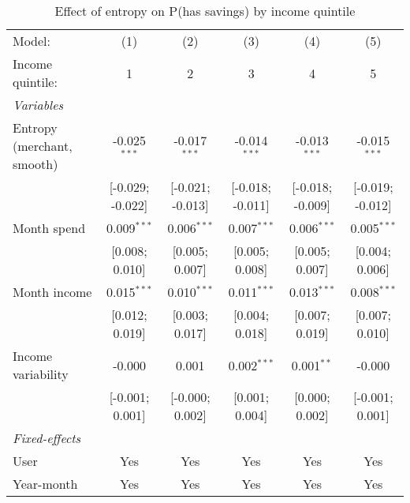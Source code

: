 
\begin{table}[htbp]
   \centering
   \tiny
   \begin{threeparttable}[b]
      \caption{\label{tab:reg_has_inflows_entropy_merchant_sz_inc_quint} Effect of entropy on P(has savings) by income quintile}
      \begin{tabular}{lccccc}
         \tabularnewline \midrule \midrule
         Model:                     & (1)              & (2)              & (3)              & (4)              & (5)\\  
         Income quintile:           & 1                & 2                & 3                & 4                & 5 \\   
         \midrule
         \emph{Variables}\\
         Entropy (merchant, smooth) & -0.025$^{***}$   & -0.017$^{***}$   & -0.014$^{***}$   & -0.013$^{***}$   & -0.015$^{***}$\\   
                                    & [-0.029; -0.022] & [-0.021; -0.013] & [-0.018; -0.011] & [-0.018; -0.009] & [-0.019; -0.012]\\   
         Month spend                & 0.009$^{***}$    & 0.006$^{***}$    & 0.007$^{***}$    & 0.006$^{***}$    & 0.005$^{***}$\\   
                                    & [0.008; 0.010]   & [0.005; 0.007]   & [0.005; 0.008]   & [0.005; 0.007]   & [0.004; 0.006]\\   
         Month income               & 0.015$^{***}$    & 0.010$^{***}$    & 0.011$^{***}$    & 0.013$^{***}$    & 0.008$^{***}$\\   
                                    & [0.012; 0.019]   & [0.003; 0.017]   & [0.004; 0.018]   & [0.007; 0.019]   & [0.007; 0.010]\\   
         Income variability         & -0.000           & 0.001            & 0.002$^{***}$    & 0.001$^{**}$     & -0.000\\   
                                    & [-0.001; 0.001]  & [-0.000; 0.002]  & [0.001; 0.004]   & [0.000; 0.002]   & [-0.001; 0.001]\\   
         \midrule
         \emph{Fixed-effects}\\
         User                       & Yes              & Yes              & Yes              & Yes              & Yes\\  
         Year-month                 & Yes              & Yes              & Yes              & Yes              & Yes\\  

\end{tabular}
\end{threeparttable}
\end{table}
